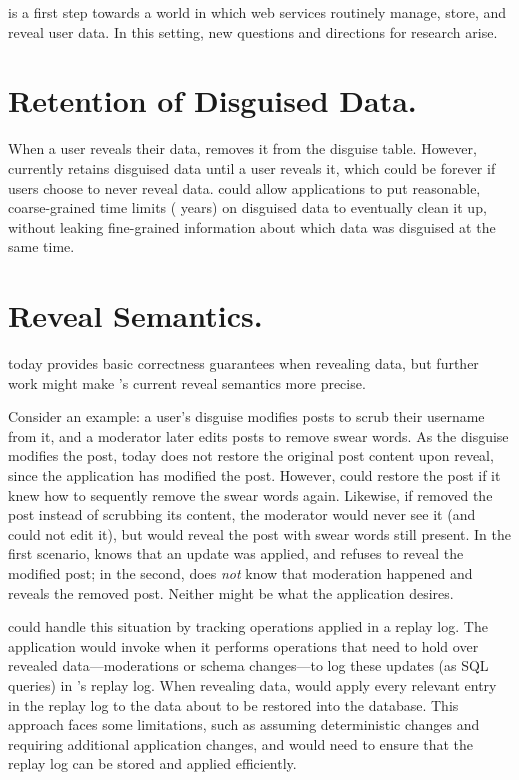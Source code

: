 \sys is a first step towards a world in which web services
routinely manage, store, and reveal \xxed user data.
%
In this setting, new questions and directions for research arise.
%

\section{Retention of Disguised Data.}
%
When a user reveals their data, \sys removes it from the disguise table.
%
However, \sys currently retains disguised data until a user reveals it, which
could be forever if users choose to never reveal data.
%
\sys could allow applications to put reasonable,
coarse-grained time limits ( years) on disguised data to eventually clean
it up, without leaking fine-grained information about which data was disguised
at the same time.

\section{Reveal Semantics.}
%
\sys today provides basic correctness guarantees when revealing data, but
further work might make \sys's current reveal semantics more precise.
%

Consider an example: a user's disguise modifies posts to scrub their username
from it, and a moderator later edits posts to remove swear words.
%
As the disguise modifies the post, \sys today does not restore the
original post content upon reveal, since the application has modified the post.
%
However, \sys could restore the post if it knew how to sequently remove the
swear words again.
%
Likewise, if \sys removed the post instead of scrubbing its content, the
moderator would never see it (and could not edit it), but \sys would reveal the
post with swear words still present.
%
In the first scenario, \sys knows that an update was applied, and refuses to
reveal the modified post; in the second, \sys does \emph{not} know that
moderation happened and reveals the removed post.
%
Neither might be what the application desires.
%

\sys could handle this situation by tracking operations applied in a replay log.
%
The application would invoke \sys when it performs operations that need to hold
over revealed data---\eg moderations or schema changes---to log these updates
(as \eg SQL queries) in \sys's replay log.
%
When revealing data, \sys would apply every relevant entry in the replay log
to the data about to be restored into the database.
%
This approach faces some limitations, such as assuming deterministic changes
and requiring additional application changes, and would need to ensure that
the replay log can be stored and applied efficiently.
%

